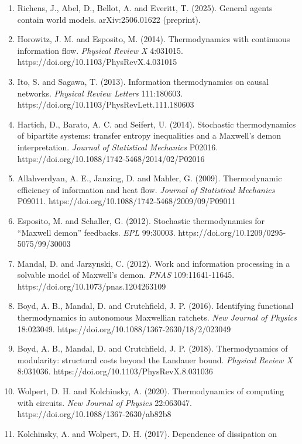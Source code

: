 \documentclass[
  10pt,
]{article}
\begin{document}
\begin{enumerate}
  models. \emph{International Conference on Learning Representations
  (ICLR 2024)}, oral, honorable mention. arXiv:2402.10877.
\item
  Richens, J., Abel, D., Bellot, A. and Everitt, T. (2025). General
  agents contain world models. arXiv:2506.01622 (preprint).
\item
  Horowitz, J. M. and Esposito, M. (2014). Thermodynamics with
  continuous information flow. \emph{Physical Review X} 4:031015.
  https://doi.org/10.1103/PhysRevX.4.031015
\item
  Ito, S. and Sagawa, T. (2013). Information thermodynamics on causal
  networks. \emph{Physical Review Letters} 111:180603.
  https://doi.org/10.1103/PhysRevLett.111.180603
\item
  Hartich, D., Barato, A. C. and Seifert, U. (2014). Stochastic
  thermodynamics of bipartite systems: transfer entropy inequalities and
  a Maxwell's demon interpretation. \emph{Journal of Statistical
  Mechanics} P02016. https://doi.org/10.1088/1742-5468/2014/02/P02016
\item
  Allahverdyan, A. E., Janzing, D. and Mahler, G. (2009). Thermodynamic
  efficiency of information and heat flow. \emph{Journal of Statistical
  Mechanics} P09011. https://doi.org/10.1088/1742-5468/2009/09/P09011
\item
  Esposito, M. and Schaller, G. (2012). Stochastic thermodynamics for
  ``Maxwell demon'' feedbacks. \emph{EPL} 99:30003.
  https://doi.org/10.1209/0295-5075/99/30003
\item
  Mandal, D. and Jarzynski, C. (2012). Work and information processing
  in a solvable model of Maxwell's demon. \emph{PNAS} 109:11641-11645.
  https://doi.org/10.1073/pnas.1204263109
\item
  Boyd, A. B., Mandal, D. and Crutchfield, J. P. (2016). Identifying
  functional thermodynamics in autonomous Maxwellian ratchets. \emph{New
  Journal of Physics} 18:023049.
  https://doi.org/10.1088/1367-2630/18/2/023049
\item
  Boyd, A. B., Mandal, D. and Crutchfield, J. P. (2018). Thermodynamics
  of modularity: structural costs beyond the Landauer bound.
  \emph{Physical Review X} 8:031036.
  https://doi.org/10.1103/PhysRevX.8.031036
\item
  Wolpert, D. H. and Kolchinsky, A. (2020). Thermodynamics of computing
  with circuits. \emph{New Journal of Physics} 22:063047.
  https://doi.org/10.1088/1367-2630/ab82b8
\item
  Kolchinsky, A. and Wolpert, D. H. (2017). Dependence of dissipation on

\end{enumerate}
\end{document}
